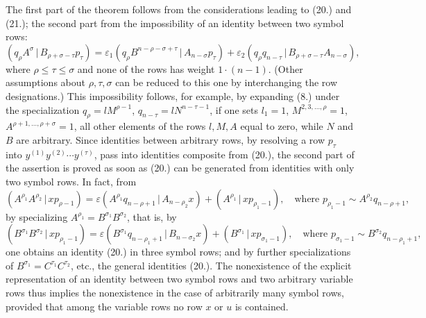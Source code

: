 \documentclass[11pt]{article}
\newcommand{\pair}[2]{(#1\,|\,#2)}
\newcommand{\eps}{\varepsilon}
\begin{document}
The first part of the theorem follows from the considerations leading to (20.) and (21.); the second part from the impossibility of an identity between two symbol rows:
\[
\pair{q_\rho A^\sigma}{B_{\rho+\sigma-\tau}p_\tau}
=\eps_1\pair{q_\rho B^{n-\rho-\sigma+\tau}}{A_{n-\sigma}p_\tau}
+\eps_2\pair{q_\rho q_{n-\tau}}{B_{\rho+\sigma-\tau}A_{n-\sigma}},
\]
where $\rho\le\tau\le\sigma$ and none of the rows has weight $1\cdot(n-1)$. (Other assumptions about $\rho,\tau,\sigma$ can be reduced to this one by interchanging the row designations.) This impossibility follows, for example, by expanding (8.) under the specialization $q_\rho=lM^{\rho-1}$, $q_{n-\tau}=lN^{n-\tau-1}$, if one sets $l_1=1$, $M^{2,3,\ldots,\rho}=1$, $A^{\rho+1,\ldots,\rho+\sigma}=1$, all other elements of the rows $l,M,A$ equal to zero, while $N$ and $B$ are arbitrary. Since identities between arbitrary rows, by resolving a row $p_\tau$ into $y^{(1)}y^{(2)}\cdots y^{(\tau)}$, pass into identities composite from (20.), the second part of the assertion is proved as soon as (20.) can be generated from identities with only two symbol rows. In fact, from
\begin{equation}
\pair{A^{\rho_1}A^{\rho_2}}{xp_{\rho-1}}
=\eps\pair{A^{\rho_1}q_{n-\rho+1}}{A_{n-\rho_2}x}
+\pair{A^{\rho_1}}{xp_{\rho_1-1}},
\quad \text{where }p_{\rho_1-1}\sim A^{\rho_2}q_{n-\rho+1},
\tag{20a}
\end{equation}
by specializing $A^{\rho_1}=B^{\sigma_1}B^{\sigma_2}$, that is, by
\[
\pair{B^{\sigma_1}B^{\sigma_2}}{xp_{\rho_1-1}}
=\eps\pair{B^{\sigma_1}q_{n-\rho_1+1}}{B_{n-\sigma_2}x}
+\pair{B^{\sigma_1}}{xp_{\sigma_1-1}},
\quad \text{where } p_{\sigma_1-1}\sim B^{\sigma_2}q_{n-\rho_1+1},
\]
one obtains an identity (20.) in three symbol rows; and by further specializations of $B^{\sigma_1}=C^{\tau_1}C^{\tau_2}$, etc., the general identities (20.). The nonexistence of the explicit representation of an identity between two symbol rows and two arbitrary variable rows thus implies the nonexistence in the case of arbitrarily many symbol rows, provided that among the variable rows no row $x$ or $u$ is contained.
\end{document}
